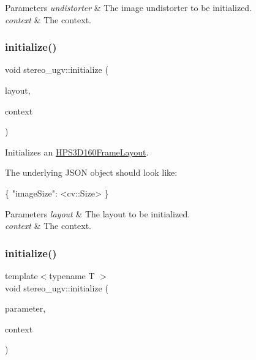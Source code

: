 \begin{DoxyParams}{Parameters}
{\em undistorter} & The image undistorter to be initialized. \\
\hline
{\em context} & The context. \\
\hline
\end{DoxyParams}
\mbox{\label{namespacestereo__ugv_ac02cc03581ba53b911a9a7bd87f9a24c}} 
\subsubsection{\texorpdfstring{initialize()}{initialize()}\hspace{0.1cm}{\footnotesize\ttfamily [2/9]}}
{\footnotesize\ttfamily void stereo\+\_\+ugv\+::initialize (\begin{DoxyParamCaption}\item[{\hyperlink{classstereo__ugv_1_1HPS3D160FrameLayout}{H\+P\+S3\+D160\+Frame\+Layout} $\ast$}]{layout,  }\item[{const \hyperlink{classstereo__ugv_1_1Context}{Context} \&}]{context }\end{DoxyParamCaption})}



Initializes an \hyperlink{classstereo__ugv_1_1HPS3D160FrameLayout}{H\+P\+S3\+D160\+Frame\+Layout}. 

The underlying J\+S\+ON object should look like\+: 
\begin{DoxyCode}
\{
  \textcolor{stringliteral}{"imageSize"}: <cv::Size>
\}
\end{DoxyCode}
 
\begin{DoxyParams}{Parameters}
{\em layout} & The layout to be initialized. \\
\hline
{\em context} & The context. \\
\hline
\end{DoxyParams}
\mbox{\label{namespacestereo__ugv_a6971cc11001fdf589a71f6fb3099c65b}} 
\subsubsection{\texorpdfstring{initialize()}{initialize()}\hspace{0.1cm}{\footnotesize\ttfamily [3/9]}}
{\footnotesize\ttfamily template$<$typename T $>$ \\
void stereo\+\_\+ugv\+::initialize (\begin{DoxyParamCaption}\item[{T $\ast$}]{parameter,  }\item[{const \hyperlink{classstereo__ugv_1_1Context}{Context} \&}]{context }\end{DoxyParamCaption})\hspace{0.3cm}{\ttfamily [inline]}}



